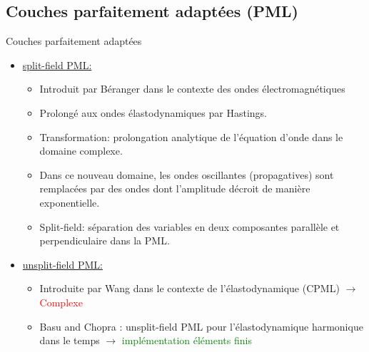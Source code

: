\subsection{Couches parfaitement adaptées (PML)}
\begin{frame}{Couches parfaitement adaptées}
\pause
    \begin{itemize}
        \item \underline{split-field PML:} 
        \begin{itemize}
        \pause
            \item Introduit par Béranger dans le contexte des ondes électromagnétiques
            \item Prolongé aux ondes élastodynamiques par Hastings.
            \item Transformation: prolongation analytique de l'équation d'onde dans le domaine complexe.
            \item Dans ce nouveau domaine, les ondes oscillantes (propagatives) sont remplacées par des ondes dont l'amplitude décroit de manière exponentielle.
            \item Split-field: séparation des variables en deux composantes parallèle et perpendiculaire dans la PML.
        \end{itemize}
    \item \underline{unsplit-field PML:} 
        \begin{itemize}
        \pause
            \item Introduite par Wang dans le contexte de l'élastodynamique (CPML) $\rightarrow$ \textcolor{red}{Complexe} 
            \pause
            \item Basu and Chopra \cite{Basu2003}: unsplit-field PML pour l'élastodynamique harmonique dans le temps $\rightarrow$ \textcolor{green}{implémentation éléments finis}
        \end{itemize}
    \end{itemize}
\end{frame}



